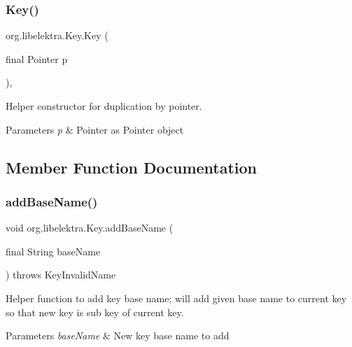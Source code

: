 \subsubsection{\texorpdfstring{Key()}{Key()}\hspace{0.1cm}{\footnotesize\ttfamily [2/2]}}
{\footnotesize\ttfamily org.\+libelektra.\+Key.\+Key (\begin{DoxyParamCaption}\item[{final Pointer}]{p }\end{DoxyParamCaption})\hspace{0.3cm}{\ttfamily [inline]}, {\ttfamily [protected]}}



Helper constructor for duplication by pointer. 


\begin{DoxyParams}{Parameters}
{\em p} & Pointer as Pointer object \\
\hline
\end{DoxyParams}


\subsection{Member Function Documentation}
\mbox{\label{classorg_1_1libelektra_1_1Key_a07a939d44265c7b017104f3f37e9ca16}} 
\subsubsection{\texorpdfstring{addBaseName()}{addBaseName()}}
{\footnotesize\ttfamily void org.\+libelektra.\+Key.\+add\+Base\+Name (\begin{DoxyParamCaption}\item[{final String}]{base\+Name }\end{DoxyParamCaption}) throws Key\+Invalid\+Name\hspace{0.3cm}{\ttfamily [inline]}}



Helper function to add key base name; will add given base name to current key so that new key is sub key of current key. 


\begin{DoxyParams}{Parameters}
{\em base\+Name} & New key base name to add \\
\hline
\end{DoxyParams}

